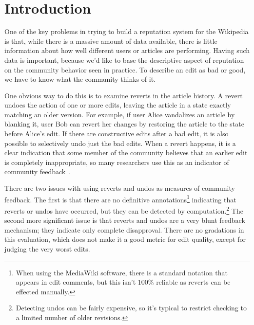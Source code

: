\section{Introduction}

One of the key problems in trying to build a reputation system
for the Wikipedia is that, while there is a massive amount of
data available, there is little information about how well different
users or articles are performing.
Having such data is important, because we'd like to base the
descriptive aspect of reputation on the community behavior seen
in practice.
To describe an edit as bad or good, we have to know what the
community thinks of it.

One obvious way to do this is to examine reverts
in the article history.
A revert undoes the action of one or more edits, leaving
the article in a state exactly matching an older version.
For example, if user Alice vandalizes an article by blanking it,
user Bob can revert her changes by restoring the article to the
state before Alice's edit.
If there are constructive edits after a bad edit, it is also possible
to selectively undo just the bad edits.
When a revert happens, it is a clear indication that some member
of the community believes that an earlier edit is completely
inappropriate, so many researchers use this as an indicator of
community feedback~\cite{Adler2007,Smets2008,Itakura2009,Belani2010}.

There are two issues with using reverts and undos
as measures of community feedback.
The first is that there are no definitive
annotations\footnote{When using the MediaWiki software,
there is a standard notation that appears in edit comments,
but this isn't 100\% reliable as reverts can be effected manually.}
indicating that reverts or undos have occurred,
but they can be detected by
computation.\footnote{Detecting undos can be fairly expensive, so
it's typical to restrict checking to a limited number of older revisions.}
The second more significant issue is that reverts and undos
are a very blunt feedback mechanism; they indicate only complete disapproval.
There are no gradations in this evaluation, which does not make
it a good metric for edit quality, except for judging the very worst
edits.

